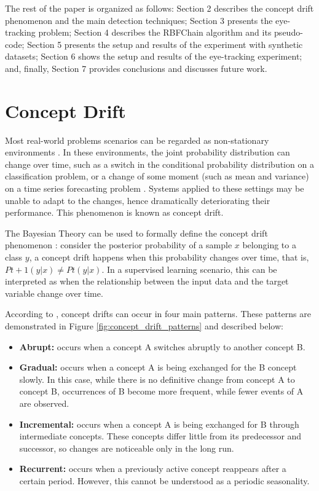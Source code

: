 \documentclass[preprint,12pt]{elsarticle}
\begin{document}
The rest of the paper is organized as follows:
Section 2 describes the concept drift phenomenon and the main detection techniques;
Section 3 presents the eye-tracking problem;
Section 4 describes the RBFChain algorithm and its pseudo-code;
Section 5 presents the setup and results of the experiment with synthetic datasets;
Section 6 shows the setup and results of the eye-tracking experiment;
and, finally, Section 7 provides conclusions and discusses future work.

\section{Concept Drift}
\label{sec:concept_drift}

Most real-world problems scenarios can be regarded as non-stationary environments \cite{Gama:2014:DAF:2670967.2670971}.
In these environments, the joint probability distribution can change over time,
such as a switch in the conditional probability distribution on a classification problem,
or a change of some moment (such as mean and variance) on a time series forecasting problem \cite{tsymbal2004problem}.
%
Systems applied to these settings may be unable to adapt to the changes, hence dramatically deteriorating their performance.
This phenomenon is known as concept drift.

The Bayesian Theory can be used to formally define the concept drift phenomenon \cite{Elwell:2011}:
consider the posterior probability of a sample $x$ belonging to a class $y$, a concept drift happens when this probability changes over time, that is, $Pt + 1 (y | x) \neq Pt (y | x)$. In a supervised learning scenario, this can be interpreted as when the relationship between the input data and the target variable change over time.

According to \cite{tsymbal2004problem, Gama:2014:DAF:2670967.2670971}, concept drifts can occur in four main patterns.
These patterns are demonstrated in Figure \ref{fig:concept_drift_patterns} and described below:

\begin{itemize}
    \item \textbf{Abrupt:} occurs when a concept A switches abruptly to another concept B.
    \item \textbf{Gradual:} occurs when a concept A is being exchanged for the B concept slowly. In this case, while there is no definitive change from concept A to concept B, occurrences of B become more frequent, while fewer events of A are observed.
    \item \textbf{Incremental:} occurs when a concept A is being exchanged for B through intermediate concepts.  These concepts differ little from its predecessor and successor, so changes are noticeable only in the long run.
    \item \textbf{Recurrent:} occurs when a previously active concept reappears after a certain period. However, this cannot be understood as a periodic seasonality.
\end{itemize}
\end{document}
